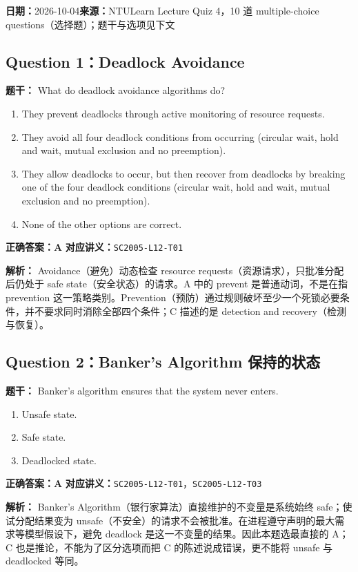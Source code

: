 \documentclass[11pt,a4paper,fontset=fandol]{ctexart}
\renewcommand{\exercisequestion}[2]{%
  \Needspace{5\baselineskip}%
  \subsection{#2}\label{exercise:#1}%
}
\renewcommand{\exercisemeta}[5]{%
  {\small\textbf{日期：}#2\quad\textbf{来源：}#3\par}%
}
\renewenvironment{checkedsolution}
  {\par\nopagebreak[4]\textbf{解析：}\ignorespaces}
  {\par}
\begin{document}
\exercisemeta
  {SC2005-HW04}
  {2026-10-04}
  {NTULearn Lecture Quiz 4，10 道 multiple-choice questions（选择题）；题干与选项见下文}
  {已完成并逐题核对}
  {是（2026-10-04）}

\exercisequestion{SC2005-HW04-Q01}{Question 1：Deadlock Avoidance}

\textbf{题干：} What do deadlock avoidance algorithms do?

\begin{enumerate}[label=\Alph*.,leftmargin=2.4em]
  \item They prevent deadlocks through active monitoring of resource requests.
  \item They avoid all four deadlock conditions from occurring (circular wait, hold and wait, mutual exclusion and no preemption).
  \item They allow deadlocks to occur, but then recover from deadlocks by breaking one of the four deadlock conditions (circular wait, hold and wait, mutual exclusion and no preemption).
  \item None of the other options are correct.
\end{enumerate}

\textbf{正确答案：A}\qquad
\textbf{对应讲义：}\texttt{SC2005-L12-T01}

\begin{checkedsolution}
Avoidance（避免）动态检查 resource requests（资源请求），只批准分配后仍处于 safe state（安全状态）的请求。A 中的 prevent 是普通动词，不是在指 prevention 这一策略类别。Prevention（预防）通过规则破坏至少一个死锁必要条件，并不要求同时消除全部四个条件；C 描述的是 detection and recovery（检测与恢复）。
\end{checkedsolution}

\exercisequestion{SC2005-HW04-Q02}{Question 2：Banker's Algorithm 保持的状态}

\textbf{题干：} Banker's algorithm ensures that the system never enters.

\begin{enumerate}[label=\Alph*.,leftmargin=2.4em]
  \item Unsafe state.
  \item Safe state.
  \item Deadlocked state.
\end{enumerate}

\textbf{正确答案：A}\qquad
\textbf{对应讲义：}\texttt{SC2005-L12-T01}，\texttt{SC2005-L12-T03}

\begin{checkedsolution}
Banker's Algorithm（银行家算法）直接维护的不变量是系统始终 safe；使试分配结果变为 unsafe（不安全）的请求不会被批准。在进程遵守声明的最大需求等模型假设下，避免 deadlock 是这一不变量的结果。因此本题选最直接的 A；C 也是推论，不能为了区分选项而把 C 的陈述说成错误，更不能将 unsafe 与 deadlocked 等同。
\end{checkedsolution}
\end{document}

